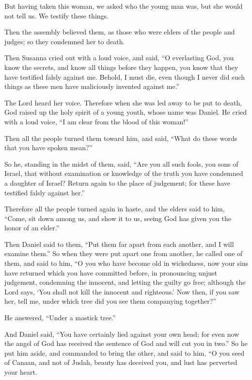 {But having taken this woman, we asked who the young man was, but she would not tell us. We testify these things.
\par }{\PP {}Then the assembly believed them, as those who were elders of the people and judges; so they condemned her to death.
\par }{\PP {}Then Susanna cried out with a loud voice, and said, “O everlasting God, you know the secrets, and know all things before they happen,
you know that they have testified falsly against me. Behold, I must die, even though I never did such things as these men have maliciously invented against me.”
\par }{\PP {}The Lord heard her voice.
Therefore when she was led away to be put to death, God raised up the holy spirit of a young youth, whose name was Daniel.
He cried with a loud voice, “I am clear from the blood of this woman!”
\par }{\PP {}Then all the people turned them toward him, and said, “What do these words that you have spoken mean?”
\par }{\PP {}So he, standing in the midst of them, said, “Are you all such fools, you sons of Israel, that without examination or knowledge of the truth you have condemned a daughter of Israel?
Return again to the place of judgement; for these have testified falsly against her.”
\par }{\PP {}Therefore all the people turned again in haste, and the elders said to him, “Come, sit down among us, and show it to us, seeing God has given you the honor of an elder.”
\par }{\PP {}Then Daniel said to them, “Put them far apart from each another, and I will examine them.”
So when they were put apart one from another, he called one of them, and said to him, “O you who have become old in wickedness, now your sins have returned which you have committed before,
in pronouncing unjust judgement, condemning the innocent, and letting the guilty go free; although the Lord says, ‘You shall not kill the innocent and righteous.’
Now then, if you saw her, tell me, under which tree did you see them companying together?”
\par }{\PP He answered, “Under a mastick tree.”
\par }{\PP {}And Daniel said, “You have certainly lied against your own head; for even now the angel of God has received the sentence of God and will cut you in two.”
So he put him aside, and commanded to bring the other, and said to him, “O you seed of Canaan, and not of Judah, beauty has deceived you, and lust has perverted your heart.
}
